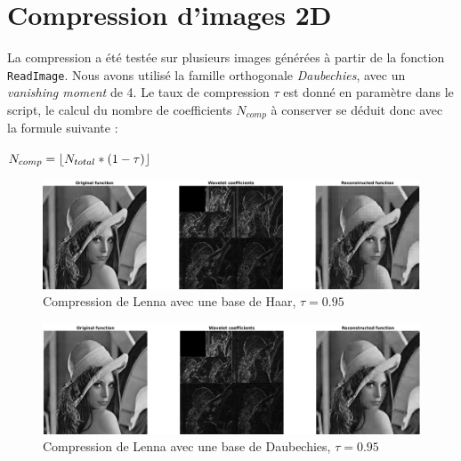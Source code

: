 \documentclass[a4paper,12pt, openany, twoside]{article}
\DeclarePairedDelimiter\floor{\lfloor}{\rfloor}
\theoremstyle{break}
\begin{document}



\pagestyle{fancy}


\tableofcontents

\clearpage

\listoffigures

\clearpage

\section{Compression d'images 2D}
La compression a été testée sur plusieurs images générées à partir de la fonction \texttt{ReadImage}. Nous avons utilisé la famille orthogonale \textit{Daubechies}, avec un \textit{vanishing moment} de 4. Le taux de compression $\tau$ est donné en paramètre dans le script, le calcul du nombre de coefficients $N_{comp}$ à conserver se déduit donc avec la formule suivante :

  $N_{comp} = \floor* {N_{total} * (1 - \tau)}$





\begin{figure}[H]
  \centering
  \includegraphics[width=\textwidth]{comp_LennaHaar95.png}\vfill
  \caption{Compression de Lenna avec une base de Haar, $\tau=0.95$}
\end{figure}


\begin{figure}[H]
  \centering
  \includegraphics[width=\textwidth]{comp_LennaDaubechies95.png}\vfill
  \caption{Compression de Lenna avec une base de Daubechies, $\tau=0.95$}
\end{figure}
\end{document}
